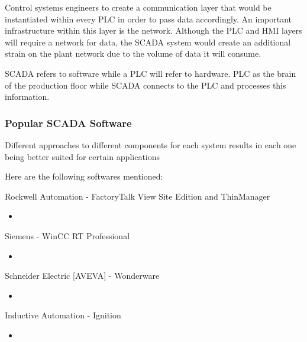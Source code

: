 \begin{concept}
    Control systems engineers to create a communication layer that would be instantiated within every PLC in order to pass data accordingly. An important infrastructure within this layer is the network. Although the PLC and HMI layers will require a network for data, the SCADA system would create an additional strain on the plant network due to the volume of data it will consume.

    SCADA refers to software while a PLC will refer to hardware. PLC as the brain of the production floor while SCADA connects to the PLC and processes this information.
\end{concept}

\subsubsection{Popular SCADA Software}
Different approaches to different components for each system results in each one being better suited for certain applications

Here are the following softwares mentioned:

Rockwell Automation - FactoryTalk View Site Edition and ThinManager
\begin{itemize}
    \item 
\end{itemize}

Siemens - WinCC RT Professional
\begin{itemize}
    \item 
\end{itemize}

Schneider Electric [AVEVA] - Wonderware
\begin{itemize}
    \item 
\end{itemize}

Inductive Automation - Ignition
\begin{itemize}
    \item 
\end{itemize}
